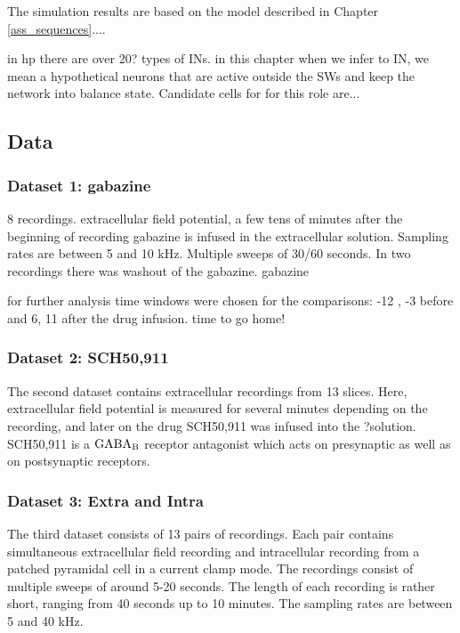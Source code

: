   The simulation results are based on the model described in Chapter
  \ref{ass_sequences}....

  in hp there are over 20? types of INs. in this chapter when we infer to
  IN, we mean a hypothetical neurons that are active outside the SWs and keep
  the network into balance state. Candidate cells for for this role are...


  \subsection{Data}
  
    \subsubsection{Dataset 1: gabazine}
     
      8 recordings.
      extracellular field potential, a few tens of minutes after the beginning of recording gabazine is infused in the extracellular solution.
      Sampling rates are between 5 and 10 kHz.
      Multiple sweeps of 30/60 seconds.
      In two recordings there was washout of the gabazine.
      gabazine 


      for further analysis time windows were chosen for the comparisons:
        -12 , -3 before and 6, 11 after the drug infusion.
        time to go home!

    \subsubsection{Dataset 2: SCH50,911}
      The second dataset contains extracellular recordings from 13 slices.
      Here, extracellular field potential is measured for several minutes
      depending on the recording, and later on the drug SCH50,911 was infused
      into the ?solution.  SCH50,911 is a ${\rm GABA_B}$ receptor antagonist
      which acts on presynaptic as well as on postsynaptic receptors.


    \subsubsection{Dataset 3: Extra and Intra}
      The third dataset consists of 13 pairs of recordings.  Each pair contains
      simultaneous extracellular field recording and intracellular recording
      from a patched pyramidal cell in a current clamp mode.  The recordings
      consist of multiple sweeps of around 5-20 seconds.  The length of each
      recording is rather short, ranging from 40 seconds up to 10 minutes.  The
      sampling rates are between 5 and 40 kHz.

